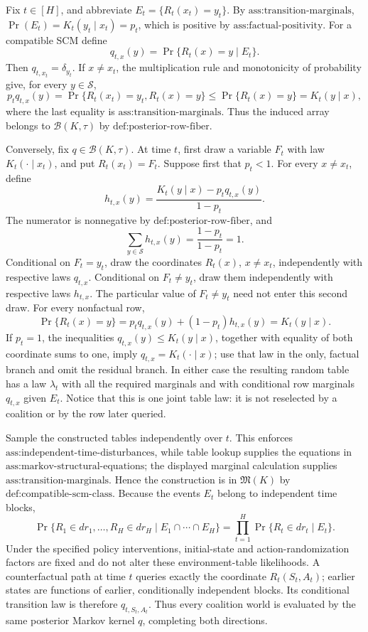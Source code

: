 Fix \(t\in[H]\), and abbreviate \(E_t=\{R_t(x_t)=y_t\}\).  By \(\text{ass:transition-marginals}\), \(\Pr(E_t)=K_t(y_t\mid x_t)=p_t\), which is positive by \(\text{ass:factual-positivity}\).  For a compatible SCM define
\[
 q_{t,x}(y)=\Pr\{R_t(x)=y\mid E_t\}.
\]
Then \(q_{t,x_t}=\delta_{y_t}\).  If \(x\ne x_t\), the multiplication rule and monotonicity of probability give, for every \(y\in\mathcal S\),
\[
 p_tq_{t,x}(y)
 =\Pr\{R_t(x_t)=y_t,R_t(x)=y\}
 \le \Pr\{R_t(x)=y\}
 =K_t(y\mid x),
\]
where the last equality is \(\text{ass:transition-marginals}\).  Thus the induced array belongs to \(\mathcal B(K,\tau)\) by \(\text{def:posterior-row-fiber}\).

Conversely, fix \(q\in\mathcal B(K,\tau)\).  At time \(t\), first draw a variable \(F_t\) with law \(K_t(\cdot\mid x_t)\), and put \(R_t(x_t)=F_t\).  Suppose first that \(p_t<1\).  For every \(x\ne x_t\), define
\[
 h_{t,x}(y)=\frac{K_t(y\mid x)-p_tq_{t,x}(y)}{1-p_t}.
\]
The numerator is nonnegative by \(\text{def:posterior-row-fiber}\), and
\[
 \sum_{y\in\mathcal S}h_{t,x}(y)
 =\frac{1-p_t}{1-p_t}=1.
\]
Conditional on \(F_t=y_t\), draw the coordinates \(R_t(x)\), \(x\ne x_t\), independently with respective laws \(q_{t,x}\).  Conditional on \(F_t\ne y_t\), draw them independently with respective laws \(h_{t,x}\).  The particular value of \(F_t\ne y_t\) need not enter this second draw.  For every nonfactual row,
\[
 \Pr\{R_t(x)=y\}
 =p_tq_{t,x}(y)+(1-p_t)h_{t,x}(y)
 =K_t(y\mid x).
\]
If \(p_t=1\), the inequalities \(q_{t,x}(y)\le K_t(y\mid x)\), together with equality of both coordinate sums to one, imply \(q_{t,x}=K_t(\cdot\mid x)\); use that law in the only, factual branch and omit the residual branch.  In either case the resulting random table has a law \(\lambda_t\) with all the required marginals and with conditional row marginals \(q_{t,x}\) given \(E_t\).  Notice that this is one joint table law: it is not reselected by a coalition or by the row later queried.

Sample the constructed tables independently over \(t\).  This enforces \(\text{ass:independent-time-disturbances}\), while table lookup supplies the equations in \(\text{ass:markov-structural-equations}\); the displayed marginal calculation supplies \(\text{ass:transition-marginals}\).  Hence the construction is in \(\mathfrak M(K)\) by \(\text{def:compatible-scm-class}\).  Because the events \(E_t\) belong to independent time blocks,
\[
 \Pr\{R_1\in dr_1,\ldots,R_H\in dr_H\mid E_1\cap\cdots\cap E_H\}
 =\prod_{t=1}^H\Pr\{R_t\in dr_t\mid E_t\}.
\]
Under the specified policy interventions, initial-state and action-randomization factors are fixed and do not alter these environment-table likelihoods.  A counterfactual path at time \(t\) queries exactly the coordinate \(R_t(S_t,A_t)\); earlier states are functions of earlier, conditionally independent blocks.  Its conditional transition law is therefore \(q_{t,S_t,A_t}\).  Thus every coalition world is evaluated by the same posterior Markov kernel \(q\), completing both directions.